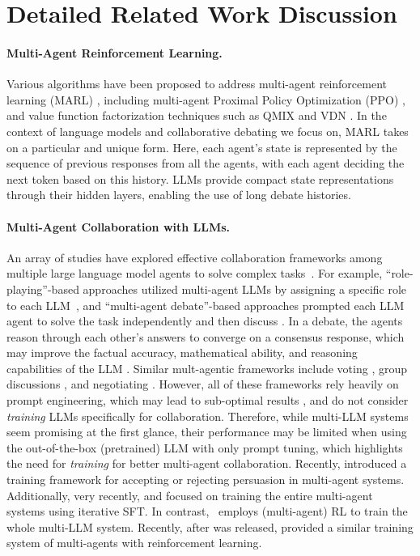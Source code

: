 \section{Detailed Related Work Discussion}
\label{appendix:literature}
\paragraph{Multi-Agent Reinforcement Learning. }
Various algorithms have been proposed to address multi-agent reinforcement learning (MARL) \cite{hernandez2019survey,zhang2021multi},  including multi-agent Proximal Policy Optimization (PPO) \citep{yu2022surprising}, and value function factorization techniques such as QMIX and VDN \citep{rashid2020monotonic, sunehag2017value}. In the context of language models and collaborative debating we focus on, MARL takes on a particular and unique form. Here, each agent's state is represented by the sequence of previous responses from all the agents, with each agent deciding the next token based on this history. LLMs provide compact state representations through their hidden layers, enabling the use of long debate histories. 

\paragraph{Multi-Agent Collaboration with LLMs. }
An array of studies have explored effective collaboration frameworks among multiple large language model agents to solve complex tasks~\citep{wu2023autogen, li2024improving, zhao2024longagent}. For example, ``role-playing''-based approaches utilized multi-agent LLMs by assigning a specific role to each LLM~\citep{li2023camel}, and ``multi-agent debate''-based approaches prompted  each LLM agent to solve the task independently and then discuss \citep{du2023improving,khandebating}. 
In a debate, the agents reason through each other's answers to converge on a consensus  response, which may improve the factual accuracy, mathematical ability, and reasoning capabilities of the LLM \citep{du2023improving,liang2023encouraging, kim2024adaptive}. Similar mult-agentic frameworks include voting \citep{wang2023selfconsistency}, group discussions \citep{chen2024reconcile}, and negotiating \citep{fu2023improving}. However, all of these frameworks rely heavily on prompt engineering, which may lead to sub-optimal results \citep{huang2023large}, and do not consider {\it training} LLMs specifically for collaboration. Therefore, while 
multi-LLM systems seem promising at the first glance, their performance may be limited when using the  out-of-the-box  (pretrained)  LLM with only prompt tuning, which highlights the need for {\it training} for better multi-agent collaboration. Recently, \citet{stengel2024teaching} introduced a training framework for accepting or rejecting persuasion in multi-agent systems. Additionally, {very recently,} 
\citet{subramaniam2025multiagent} and \citet{zhao2025sirius} focused on training the entire multi-agent systems using iterative SFT.
In contrast,  \ourstwo~employs (multi-agent) RL to train the whole multi-LLM system. Recently, after \ours was released, \citet{liao2025marft} provided a similar training system of multi-agents with reinforcement learning. 



